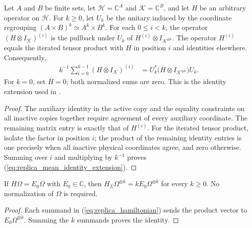 \begin{theorem}
    \label{thm:replica_mean_identity_extension}
    \leanok
    Let $A$ and $B$ be finite sets, let $\mathcal H=\mathbb C^A$ and
    $\mathcal K=\mathbb C^B$, and let $H$ be
    an arbitrary operator on $\mathcal H$. For $k\ge0$, let $U_k$ be the
    unitary induced by the coordinate regrouping
    $(A\times B)^k\simeq A^k\times B^k$.
    For each $0\le i<k$, the operator $(H\otimes I_{\mathcal K})^{(i)}$
    is the pullback under $U_k$ of $H^{(i)}\otimes I_{\mathcal K^{\otimes k}}$.
    The operator $H^{(i)}$ equals the iterated tensor product with $H$ in
    position $i$ and identities elsewhere. Consequently,
    \begin{align}
        k^{-1}\sum_{i=0}^{k-1}(H\otimes I_{\mathcal K})^{(i)}
         & =U_k^*\bigl(\overline H\otimes I_{\mathcal K^{\otimes k}}\bigr)U_k.
        \label{eq:replica_mean_identity_extension}
    \end{align}
    For $k=0$, set $\overline H=0$; both normalized sums are zero.
    This is the identity extension used in
    \cite[Sections~6 and~7]{OpenAI2026AreaLaw}.
\end{theorem}
\begin{proof}
    \leanok
    The auxiliary identity in the active copy and the equality constraints on
    all inactive copies together require agreement of every auxiliary
    coordinate. The remaining matrix entry is exactly that of $H^{(i)}$.
    For the iterated tensor product, isolate the factor in position $i$;
    the product of the remaining identity entries is one precisely when all
    inactive physical coordinates agree, and zero otherwise.
    Summing over $i$ and multiplying by $k^{-1}$ proves
    (\ref{eq:replica_mean_identity_extension}).
\end{proof}

\begin{theorem}
\label{thm:replica_product_eigenvector}
\leanok
{}
If $H\Omega=E_0\Omega$ with $E_0\in\mathbb C$, then
$H_\Sigma\Omega^{\otimes k}=kE_0\Omega^{\otimes k}$ for every $k\ge0$.
No normalization of $\Omega$ is required.
\end{theorem}
\begin{proof}
\leanok
Each summand in (\ref{eq:replica_hamiltonian}) sends the product vector to
$E_0\Omega^{\otimes k}$. Summing the $k$ summands proves the identity.
\end{proof}

